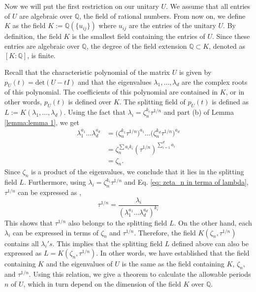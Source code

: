 \documentclass[a4paper,onecolumn,accepted=2026-04-08,10pt]{quantumarticle}
\theoremstyle{definition}
\begin{document}
Now we will put the first restriction on our unitary $U$. We assume that all entries of $U$  are algebraic over $\mathbb{Q}$, the field of rational numbers. From now on, we define $K$ as the field $K:= \mathbb{Q}(\{u_{ij}\})$ where $u_{ij}$ are the entries of the unitary $U$.  
By definition, the field $K$ is the smallest field containing the entries of $U$. Since these entries are algebraic over $\mathbb{Q}$, the degree of the field extension $\mathbb{Q}\subset K$, denoted as $[K:\mathbb{Q}]$, is finite.

Recall that the characteristic polynomial of the matrix $U$ is given by  $p_{U}(t) = \text{det}(U-tI)$ and that the eigenvalues $\lambda_1, \ldots, \lambda_d$ are the complex roots of this polynomial. The coefficients of this polynomial are contained in $K$, or in other words, $p_{U}(t)$ is defined over $K$. The splitting field of $p_{U}(t)$ is defined as $L := K(\lambda_1, \ldots, \lambda_d)$. Using the fact that $\lambda_{i} = \zeta_{n}^{k_i} \tau^{1/n}$ and part (b) of Lemma \ref{lemma:lemma 1}, we get
\begin{align} \label{eq: zeta_n in terma of lambda}
  \nonumber  \lambda_1^{a_1} \ldots \lambda_d^{a_d} &= \bigg(\zeta_{n}^{k_1} \tau^{1/n}\bigg)^{a_1} \ldots \bigg(\zeta_{n}^{k_d} \tau^{1/n}\bigg)^{a_d} \\
 \nonumber   &=\zeta_{n}^{\sum a_i k_i} (\tau^{1/n})^{\sum_{i=1}^{d} a_i} \\
    &= \zeta_n.
\end{align}
Since $\zeta_n$ is a product of the eigenvalues, we conclude that it lies in the splitting field $L$.
Furthermore, using  $\lambda_{i} = \zeta_{n}^{k_i} \tau^{1/n}$ and Eq. \eqref{eq: zeta_n in terma of lambda},  $\tau^{1/n}$ can be expressed as ,
\begin{equation}\label{eq: tau in terms of lambdas}
    \tau^{1/n} = \frac{\lambda_i}{(\lambda_1^{a_1} \ldots \lambda_d^{a_d})^{k_i}}
\end{equation}
This shows that $\tau^{1/n}$ also belongs to the splitting field $L$. On the other hand, each $\lambda_{i}$ can be expressed in terms of $\zeta_n$ and $\tau^{1/n}$. Therefore, the field $K(\zeta_n, \tau^{1/n})$ contains all $\lambda_i's$. This implies that the splitting field $L$ defined above can also be expressed as $L = K(\zeta_n, \tau^{1/n}).$ In other words, we have established that the field containing $K$ and the eigenvalues of $U$ is the same as the field containing $K$, $\zeta_n$, and $\tau^{1/n}$. Using this relation, we give a theorem to calculate the allowable periods $n$ of $U$, which in turn depend on the dimension of the field $K$ over $\mathbb{Q}$. 
\end{document}
